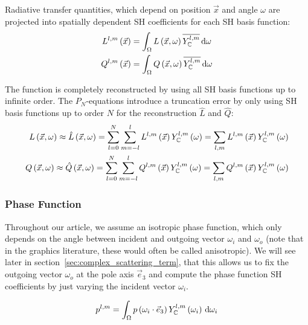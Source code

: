 \documentclass[10pt]{scrartcl}
\begin{document}
Radiative transfer quantities, which depend on position $\vec{x}$ and angle $\omega$ are projected into spatially dependent SH coefficients for each SH basis function:
\begin{align}
L^{l,m}\left(\vec{x}\right)
&=
\int_\Omega{L\left(\vec{x}, \omega\right)\overline{Y_{\mathbb{C}}^{l,m}}\,\mathrm{d}\omega}\nonumber\\
Q^{l,m}\left(\vec{x}\right)
&=
\int_\Omega{Q\left(\vec{x}, \omega\right)\overline{Y_{\mathbb{C}}^{l,m}}\,\mathrm{d}\omega}\nonumber
\end{align} 

The function is completely reconstructed by using all SH basis functions up to infinite order. The $P_N$-equations introduce a truncation error by only using SH basis functions up to order $N$ for the reconstruction $\hat{L}$ and $\hat{Q}$:
\begin{align}
\label{eq:sh_exp_L}
L\left(\vec{x}, \omega\right)
\approx
\hat{L}\left(\vec{x}, \omega\right) =
\sum_{l=0}^{N}
{
\sum_{m=-l}^{l}
{
L^{l,m}\left(\vec{x}\right)Y_{\mathbb{C}}^{l,m}\left(\omega\right)
}
}
=
\sum_{l,m}
{
L^{l,m}\left(\vec{x}\right)Y_{\mathbb{C}}^{l,m}\left(\omega\right)
}\nonumber\\
Q\left(\vec{x}, \omega\right)
\approx
\hat{Q}\left(\vec{x}, \omega\right) =
\sum_{l=0}^{N}
{
\sum_{m=-l}^{l}
{
Q^{l,m}\left(\vec{x}\right)Y_{\mathbb{C}}^{l,m}\left(\omega\right)
}
}
=
\sum_{l,m}
{
Q^{l,m}\left(\vec{x}\right)Y_{\mathbb{C}}^{l,m}\left(\omega\right)
}
\end{align}

\subsubsection{Phase Function}
\label{sec:complex_proj_phase}

Throughout our article, we assume an isotropic phase function, which only depends on the angle between incident and outgoing vector $\omega_i$ and $\omega_o$ (note that in the graphics literature, these would often be called anisotropic). We will see later in section~\ref{sec:complex_scattering_term}, that this allows us to fix the outgoing vector $\omega_o$ at the pole axis $\vec{e}_3$ and compute the phase function SH coefficients by just varying the incident vector $\omega_i$.

\begin{align*}
p^{l,m}
=
\int_\Omega
{
p\left(\omega_i\cdot\vec{e}_3\right)
Y_{\mathbb{C}}^{l,m}\left(\omega_i\right)
\,\mathrm{d}\omega_i
}
\nonumber
\end{align*}
\end{document}
